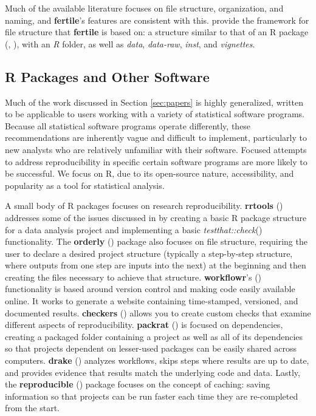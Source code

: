 \documentclass[APA,LATO1COL]{WileyNJD-v2}\usepackage[]{graphicx}\usepackage[]{color}
\newcommand{\R}{\textsf{R}\xspace}
\newcommand{\cmd}[1]{\textit{#1}}
\newcommand{\pkg}[1]{\textbf{#1}}
\newcommand{\func}[1]{\textit{#1}()}
\begin{document}
Much of the available literature focuses on file structure, organization, and naming, and \pkg{fertile}'s features are consistent with this. \cite{marwick2018packaging} provide the framework for file structure that \pkg{fertile} is based on: a structure similar to that of an \R package (\cite{coreteam-extensions}, \cite{hadley-packages}), with an \cmd{R} folder, as well as \cmd{data}, \cmd{data-raw}, \cmd{inst}, and \cmd{vignettes}.

\subsection{R Packages and Other Software}

Much of the work discussed in Section \ref{sec:papers} is highly generalized, written to be applicable to users working with a variety of statistical software programs. Because all statistical software programs operate differently, these recommendations are inherently vague and difficult to implement, particularly to new analysts who are relatively unfamiliar with their software. Focused attempts to address reproducibility in specific certain software programs are more likely to be successful. We focus on \R, due to its open-source nature, accessibility, and popularity as a tool for statistical analysis.

A small body of \R packages focuses on research reproducibility. \pkg{rrtools} (\cite{R-rrtools}) addresses some of the issues discussed in \cite{marwick2018packaging} by creating a basic \R package structure for a data analysis project and implementing a basic \func{testthat::check} functionality. The \pkg{orderly} (\cite{R-orderly}) package also focuses on file structure, requiring the user to declare a desired project structure (typically a step-by-step structure, where outputs from one step are inputs into the next) at the beginning and then creating the files necessary to achieve that structure. \pkg{workflowr}'s (\cite{R-workflowr}) functionality is based around version control and making code easily available online. It works to generate a website containing time-stamped, versioned, and documented results. \pkg{checkers} (\cite{R-checkers}) allows you to create custom checks that examine different aspects of reproducibility. \pkg{packrat} (\cite{R-packrat}) is focused on dependencies, creating a packaged folder containing a project as well as all of its dependencies so that projects dependent on lesser-used packages can be easily shared across computers. \pkg{drake} (\cite{R-drake}) analyzes workflows, skips steps where results are up to date, and provides evidence that results match the underlying code and data. Lastly, the \pkg{reproducible} (\cite{R-reproducible}) package focuses on the concept of caching: saving information so that projects can be run faster each time they are re-completed from the start.
\end{document}
